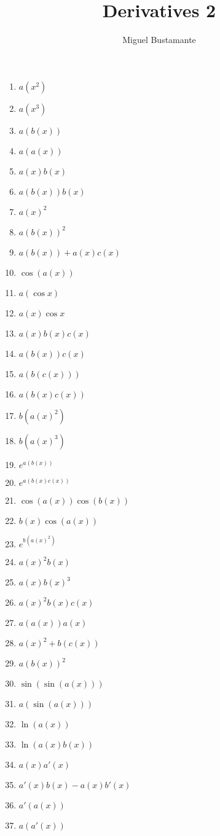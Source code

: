 \documentclass{article}
\title{Derivatives 2}
\author{Miguel Bustamante}
\begin{document}
\maketitle
\begin{multicols}{3}
\begin{enumerate}
    \item $a(x^2)$
    \item $a(x^3)$
    \item $a(b(x))$
    \item $a(a(x))$
    \item $a(x)b(x)$
    \item $a(b(x))b(x)$
    \item $a(x)^2$
    \item $a(b(x))^2$
    \item $a(b(x))+a(x)c(x)$
    \item $\cos(a(x))$
    \item $a(\cos x)$
    \item $a(x)\cos x$
    \item $a(x)b(x)c(x)$
    \item $a(b(x))c(x)$
    \item $a(b(c(x)))$
    \item $a(b(x)c(x))$
    \item $b(a(x)^2)$
    \item $b(a(x)^3)$
    \item $e^{a(b(x))}$
    \item $e^{a(b(x)c(x))}$
    \item $\cos(a(x))\cos(b(x))$
    \item $b(x)\cos(a(x))$
    \item $e^{b(a(x)^2)}$
    \item $a(x)^2 b(x)$
    \item $a(x)b(x)^3$
    \item $a(x)^2 b(x)c(x)$
    \item $a(a(x))a(x)$
    \item $a(x)^2+b(c(x))$
    \item $a(b(x))^2$
    \item $\sin(\sin(a(x)))$
    \item $a(\sin(a(x)))$
    \item $\ln(a(x))$
    \item $\ln(a(x)b(x))$
    \item $a(x)a'(x)$
    \item $a'(x)b(x)-a(x)b'(x)$
    \item $a'(a(x))$
    \item $a(a'(x))$

\end{enumerate}
\end{multicols}
\end{document}
